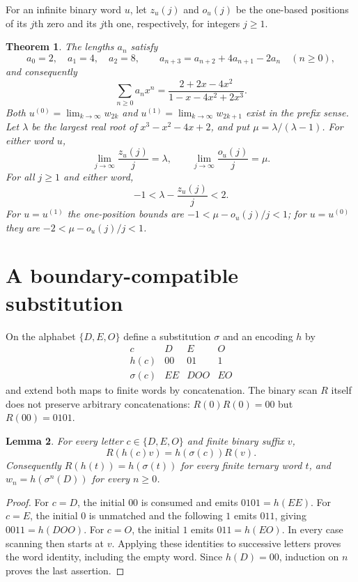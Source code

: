 \documentclass[11pt]{article}
\newtheorem{theorem}{Theorem}
\newtheorem{lemma}[theorem]{Lemma}
\begin{document}
For an infinite binary word $u$, let $z_u(j)$ and $o_u(j)$ be the
one-based positions of its $j$th zero and its $j$th one, respectively,
for integers $j\geq1$.

\begin{theorem}\label{thm:main}
The lengths $a_n$ satisfy
\begin{equation}\label{eq:recurrence}
a_0=2,\quad a_1=4,\quad a_2=8,\qquad
a_{n+3}=a_{n+2}+4a_{n+1}-2a_n\quad(n\geq0),
\end{equation}
and consequently
\begin{equation}\label{eq:gf}
\sum_{n\geq0}a_n x^n=\frac{2+2x-4x^2}{1-x-4x^2+2x^3}.
\end{equation}
Both $u^{(0)}=\lim_{k\to\infty}w_{2k}$ and
$u^{(1)}=\lim_{k\to\infty}w_{2k+1}$ exist in the prefix sense.
Let $\lambda$ be the largest real root of $x^3-x^2-4x+2$, and put
$\mu=\lambda/(\lambda-1)$. For either word $u$,
\begin{equation}\label{eq:positions}
\lim_{j\to\infty}\frac{z_u(j)}j=\lambda,
\qquad
\lim_{j\to\infty}\frac{o_u(j)}j=\mu.
\end{equation}
For all $j\geq1$ and either word,
\[
-1<\lambda-\frac{z_u(j)}j<2.
\]
For $u=u^{(1)}$ the one-position bounds are
$-1<\mu-o_u(j)/j<1$; for $u=u^{(0)}$ they are
$-2<\mu-o_u(j)/j<1$.
\end{theorem}

\section{A boundary-compatible substitution}
On the alphabet $\{D,E,O\}$ define a substitution $\sigma$ and an
encoding $h$ by
\[
\begin{array}{c|ccc}
c&D&E&O\\\hline
h(c)&00&01&1\\
\sigma(c)&EE&DOO&EO
\end{array}
\]
and extend both maps to finite words by concatenation.
The binary scan $R$ itself does not preserve arbitrary concatenations:
$R(0)R(0)=00$ but $R(00)=0101$.

\begin{lemma}\label{lem:bridge}
For every letter $c\in\{D,E,O\}$ and finite binary suffix $v$,
\begin{equation}\label{eq:boundary}
R(h(c)v)=h(\sigma(c))R(v).
\end{equation}
Consequently $R(h(t))=h(\sigma(t))$ for every finite ternary word $t$,
and $w_n=h(\sigma^n(D))$ for every $n\geq0$.
\end{lemma}
\begin{proof}
For $c=D$, the initial $00$ is consumed and emits $0101=h(EE)$.
For $c=E$, the initial $0$ is unmatched and the following $1$ emits
$011$, giving $0011=h(DOO)$. For $c=O$, the initial $1$ emits
$011=h(EO)$. In every case scanning then starts at $v$.
Applying these identities to successive letters proves the word identity,
including the empty word. Since $h(D)=00$, induction on $n$ proves the last assertion.
\end{proof}
\end{document}
